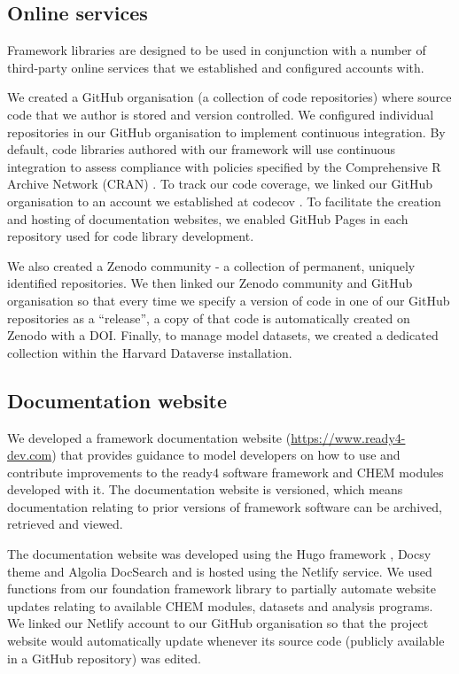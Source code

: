 \documentclass[sn-vancouver,Numbered,pdflatex]{sn-jnl}
\theoremstyle{remark}
\theoremstyle{definition}
\begin{document}
\hypertarget{online-services}{%
\subsection{Online services}\label{online-services}}

Framework libraries are designed to be used in conjunction with a number of third-party online services that we established and configured accounts with.

We created a GitHub organisation (a collection of code repositories) where source code that we author is stored and version controlled. We configured individual repositories in our GitHub organisation to implement continuous integration. By default, code libraries authored with our framework will use continuous integration to assess compliance with policies specified by the Comprehensive R Archive Network (CRAN) \citep{CRAN2022}. To track our code coverage, we linked our GitHub organisation to an account we established at codecov \citep{codecov_2022}. To facilitate the creation and hosting of documentation websites, we enabled GitHub Pages in each repository used for code library development.

We also created a Zenodo community - a collection of permanent, uniquely identified repositories. We then linked our Zenodo community and GitHub organisation so that every time we specify a version of code in one of our GitHub repositories as a ``release'', a copy of that code is automatically created on Zenodo with a DOI. Finally, to manage model datasets, we created a dedicated collection within the Harvard Dataverse installation.

\hypertarget{documentation-website}{%
\subsection{Documentation website}\label{documentation-website}}

We developed a framework documentation website (\url{https://www.ready4-dev.com}) that provides guidance to model developers on how to use and contribute improvements to the ready4 software framework and CHEM modules developed with it. The documentation website is versioned, which means documentation relating to prior versions of framework software can be archived, retrieved and viewed.

The documentation website was developed using the Hugo framework \citep{hugo_2023}, Docsy theme \citep{docsy_2023} and Algolia DocSearch \citep{algoliadocsearch_2023} and is hosted using the Netlify \citep{netlify_2023} service. We used functions from our foundation framework library to partially automate website updates relating to available CHEM modules, datasets and analysis programs. We linked our Netlify account to our GitHub organisation so that the project website would automatically update whenever its source code (publicly available in a GitHub repository) was edited.
\end{document}
